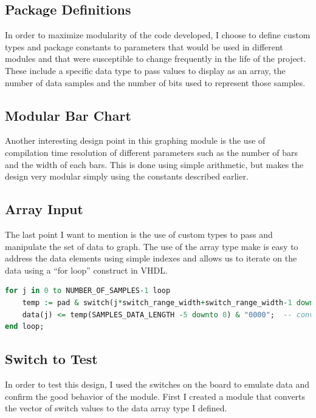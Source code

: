 \documentclass[letterpaper, titlepage, 11pt]{article}
\begin{document}
\subsection{Package Definitions}
In order to maximize modularity of the code developed, I choose to define custom types and package constants to parameters that would be used in different modules and that were susceptible to change frequently in the life of the project. These include a specific data type to pass values to display as an array, the number of data samples and the number of bits used to represent those samples.



\subsection{Modular Bar Chart}
Another interesting design point in this graphing module is the use of compilation time resolution of different parameters such as the number of bars and the width of each bars. This is done using simple arithmetic, but makes the design very modular simply using the constants described earlier.



\subsection{Array Input}
The last point I want to mention is the use of custom types to pass and manipulate the set of data to graph. The use of the array type make is easy to address the data elements using simple indexes and allows us to iterate on the data using a ``for loop'' construct in VHDL.
\begin{lstlisting}[language=VHDL]
for j in 0 to NUMBER_OF_SAMPLES-1 loop
    temp := pad & switch(j*switch_range_width+switch_range_width-1 downto j*switch_range_width);
    data(j) <= temp(SAMPLES_DATA_LENGTH -5 downto 0) & "0000";  -- convert range of switches to data element
end loop;
\end{lstlisting}

\subsection{Switch to Test}
In order to test this design, I used the switches on the board to emulate data and confirm the good behavior of the module. First I created a module that converts the vector of switch values to the data array type I defined.
\end{document}

